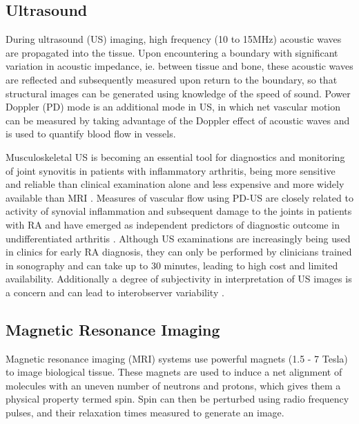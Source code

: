 \documentclass[twoside]{bhamthesis}
\theoremstyle{definition}
\begin{document}
\subsection{Ultrasound}

During ultrasound (US) imaging, high frequency (10 to 15MHz) acoustic waves are propagated into the tissue. Upon encountering a boundary with significant variation in acoustic impedance, ie. between tissue and bone, these acoustic waves are reflected and subsequently measured upon return to the boundary, so that structural images can be generated using knowledge of the speed of sound. Power Doppler (PD) mode is an additional mode in US, in which net vascular motion can be measured by taking advantage of the Doppler effect of acoustic waves and is used to quantify blood flow in vessels.

 
Musculoskeletal US is becoming an essential tool for diagnostics and monitoring of joint synovitis in patients with inflammatory arthritis, being more sensitive and reliable than clinical examination alone and less expensive and more widely available than MRI \cite{wakefield2004should,scheel2006prospective,naredo2005assessment}.  Measures of vascular flow using PD-US are closely related to activity of synovial inflammation and subsequent damage to the joints in patients with RA \cite{brown2008explanation,foltz2012power,szkudlarek2001power} and have emerged as independent predictors of diagnostic outcome in undifferentiated arthritis \cite{filer2011utility}. Although US examinations are increasingly being used in clinics for early RA diagnosis, they can only be performed by clinicians trained in sonography and can take up to 30 minutes, leading to high cost and limited availability. Additionally a degree of subjectivity in interpretation of US images is a concern and can lead to interobserver variability \cite{naredo2006interobserver}.

\subsection{Magnetic Resonance Imaging}

Magnetic resonance imaging (MRI) systems use powerful magnets (1.5 - 7 Tesla) to image biological tissue. These magnets are used to induce a net alignment of molecules with an uneven number of neutrons and protons, which gives them a physical property termed spin. Spin can then be perturbed using radio frequency pulses, and their relaxation times measured to generate an image. 
\end{document}
